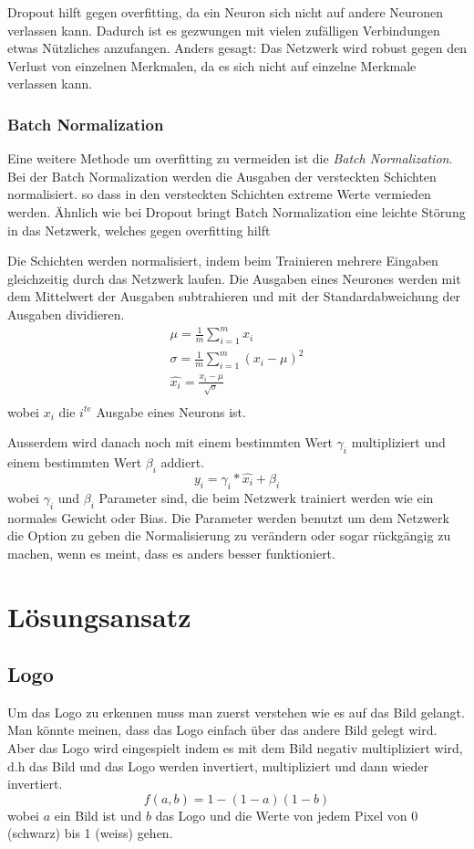 \documentclass[12pt,a4paper]{report}
\begin{document}
Dropout hilft gegen overfitting,
da ein Neuron sich nicht auf andere Neuronen verlassen kann.
Dadurch ist es gezwungen mit vielen zufälligen Verbindungen etwas Nützliches anzufangen.
Anders gesagt: Das Netzwerk wird robust gegen den Verlust von einzelnen Merkmalen, da es sich nicht auf einzelne Merkmale verlassen kann.

\subsection{Batch Normalization}
Eine weitere Methode um overfitting zu vermeiden ist die \textit{Batch Normalization}.
Bei der Batch Normalization werden die Ausgaben der versteckten Schichten normalisiert\cite{batchnorm}.
so dass in den versteckten Schichten extreme Werte vermieden werden\cite{batchnorm}.
Ähnlich wie bei Dropout bringt Batch Normalization eine leichte Störung in das Netzwerk,
welches gegen overfitting hilft\cite{batchnorm}

Die Schichten werden normalisiert, indem beim Trainieren mehrere Eingaben gleichzeitig durch das Netzwerk laufen.
Die Ausgaben eines Neurones werden mit dem Mittelwert der Ausgaben subtrahieren und mit der
Standardabweichung der Ausgaben dividieren\cite{batchnorm}.
\begin{gather*}
    \mu = \frac{1}{m}\sum^m_{i=1}x_{i}\\
    \sigma = \frac{1}{m}\sum^m_{i=1}(x_i - \mu)^2\\
    \hat{x_i} = \frac{x_i - \mu}{\sqrt{\sigma}}\\
\end{gather*}
wobei $x_i$ die $i^{te}$ Ausgabe eines Neurons ist.

Ausserdem wird danach noch mit einem bestimmten Wert $\gamma_i$ multipliziert und einem bestimmten Wert $\beta_i$ addiert.
\[y_i = \gamma_i * \hat{x_i} + \beta_i \]
wobei $\gamma_i$ und $\beta_i$ Parameter sind, die beim Netzwerk trainiert werden wie ein normales Gewicht oder Bias\cite{batchnorm}.
Die Parameter werden benutzt um dem Netzwerk die Option zu geben die Normalisierung zu verändern oder sogar rückgängig zu machen, wenn es meint,
dass es anders besser funktioniert\cite{batchnorm_paper}.

\chapter{Lösungsansatz}
\label{ch:lösungsansatz}
\section{Logo}
Um das Logo zu erkennen muss man zuerst verstehen wie es auf das Bild gelangt.
Man könnte meinen, dass das Logo einfach über das andere Bild gelegt wird.
Aber das Logo wird eingespielt indem es mit dem Bild negativ multipliziert wird,
d.h das Bild und das Logo werden invertiert, multipliziert und dann wieder invertiert\cite{wiki:blend}.
\[f(a,b) = 1 - (1-a)(1-b)\]
wobei $a$ ein Bild ist und $b$ das Logo und die Werte von jedem Pixel von 0 (schwarz) bis 1 (weiss) gehen.
\end{document}
